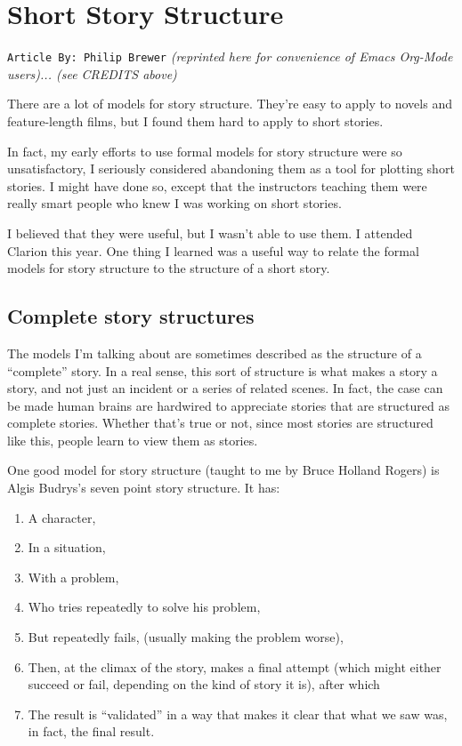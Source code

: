 \documentclass[openleft,oneside,showtrims]{memoir}
\begin{document}
\chapter{Short Story Structure}
\label{sec:org28b0f1a}
\label{CHAPTER_Short-Story-Structure}
\texttt{Article By: Philip Brewer} \emph{(reprinted here for convenience of Emacs Org-Mode users)... (see CREDITS above)}

There are a lot of models for story structure. They’re easy to apply to novels and feature-length films, but I found them hard to apply to short stories.

In fact, my early efforts to use formal models for story structure were so unsatisfactory, I seriously considered abandoning them as a tool for plotting short stories. I might have done so, except that the instructors teaching them were really smart people who knew I was working on short stories.

I believed that they were useful, but I wasn’t able to use them.
I attended Clarion this year. One thing I learned was a useful way to relate the formal models for story structure to the structure of a short story.

\section{Complete story structures}
\label{sec:org7ad4bc3}

The models I’m talking about are sometimes described as the structure of a “complete” story. In a real sense, this sort of structure is what makes a story a story, and not just an incident or a series of related scenes.  In fact, the case can be made human brains are hardwired to appreciate stories that are structured as complete stories.  Whether that’s true or not, since most stories are structured like this, people learn to view them as stories.

One good model for story structure (taught to me by Bruce Holland Rogers) is Algis Budrys’s seven point story structure. It has:

\begin{enumerate}
\item A character,

\item In a situation,

\item With a problem,

\item Who tries repeatedly to solve his problem,

\item But repeatedly fails, (usually making the problem worse),

\item Then, at the climax of the story, makes a final attempt (which might either succeed or fail, depending on the kind of story it is), after which

\item The result is “validated” in a way that makes it clear that what we saw was, in fact, the final result.
\end{enumerate}
\end{document}
